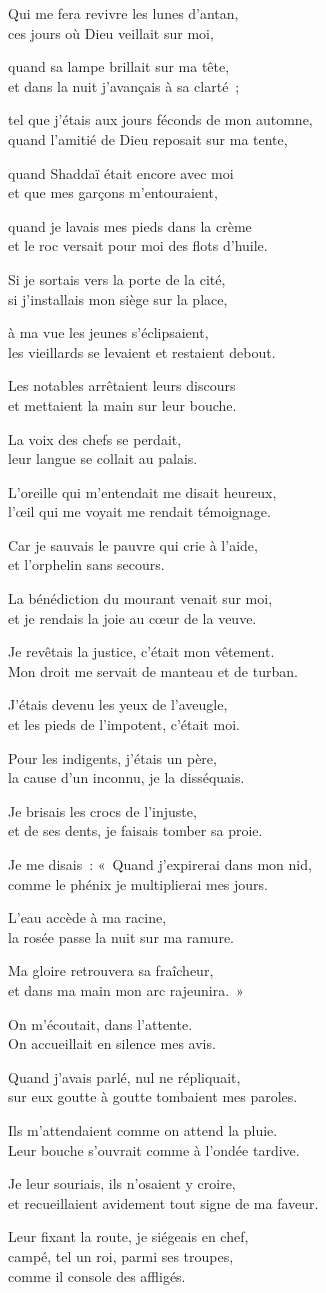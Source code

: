 \documentclass[twoside]{book} %
\newcommand{\lnatt}[1]{\reversemarginpar\marginpar[\sffamily\scriptsize #1]{}}
\newcommand{\lpar}[1]{\noindent\hangindent=2\parindent  #1\par} %
\newcommand\chapterclose{} %
\renewcommand{\lnatt}[1]{\marginpar{\sffamily\scriptsize #1}}
\begin{document}
\lpar{Qui me fera revivre les lunes d’antan, \\
ces jours où Dieu veillait sur moi,}
\lpar{quand sa lampe brillait sur ma tête, \\
et dans la nuit j’avançais à sa clarté ;}
\lpar{tel que j’étais aux jours féconds de mon automne, \\
quand l’amitié de Dieu reposait sur ma tente,}
\lpar{\lnatt{5}quand Shaddaï était encore avec moi \\
et que mes garçons m’entouraient,}
\lpar{quand je lavais mes pieds dans la crème \\
et le roc versait pour moi des flots d’huile.}
\lpar{Si je sortais vers la porte de la cité, \\
si j’installais mon siège sur la place,}
\lpar{à ma vue les jeunes s’éclipsaient, \\
les vieillards se levaient et restaient debout.}
\lpar{Les notables arrêtaient leurs discours \\
et mettaient la main sur leur bouche.}
\lpar{\lnatt{10}La voix des chefs se perdait, \\
leur langue se collait au palais.}
\lpar{L’oreille qui m’entendait me disait heureux, \\
l’œil qui me voyait me rendait témoignage.}
\lpar{Car je sauvais le pauvre qui crie à l’aide, \\
et l’orphelin sans secours.}
\lpar{La bénédiction du mourant venait sur moi, \\
et je rendais la joie au cœur de la veuve.}
\lpar{Je revêtais la justice, c’était mon vêtement. \\
Mon droit me servait de manteau et de turban.}
\lpar{\lnatt{15}J’étais devenu les yeux de l’aveugle, \\
et les pieds de l’impotent, c’était moi.}
\lpar{Pour les indigents, j’étais un père, \\
la cause d’un inconnu, je la disséquais.}
\lpar{Je brisais les crocs de l’injuste, \\
et de ses dents, je faisais tomber sa proie.}
\lpar{Je me disais : « Quand j’expirerai dans mon nid, \\
comme le phénix je multiplierai mes jours.}
\lpar{L’eau accède à ma racine, \\
la rosée passe la nuit sur ma ramure.}
\lpar{\lnatt{20}Ma gloire retrouvera sa fraîcheur, \\
et dans ma main mon arc rajeunira. »}
\lpar{On m’écoutait, dans l’attente. \\
On accueillait en silence mes avis.}
\lpar{Quand j’avais parlé, nul ne répliquait, \\
sur eux goutte à goutte tombaient mes paroles.}
\lpar{Ils m’attendaient comme on attend la pluie. \\
Leur bouche s’ouvrait comme à l’ondée tardive.}
\lpar{Je leur souriais, ils n’osaient y croire, \\
et recueillaient avidement tout signe de ma faveur.}
\lpar{\lnatt{25}Leur fixant la route, je siégeais en chef, \\
campé, tel un roi, parmi ses troupes, \\
comme il console des affligés.}
\chapterclose
\end{document}
